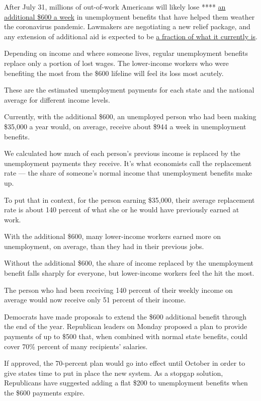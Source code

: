 After July 31, millions of out-of-work Americans will likely lose ****
\href{https://www.nytimes3xbfgragh.onion/2020/07/23/business/economy/unemployment-benefits.html}{an
additional \$600 a week} in unemployment benefits that have helped them
weather the coronavirus pandemic. Lawmakers are negotiating a new relief
package, and any extension of additional aid is expected to be
\href{https://www.nytimes3xbfgragh.onion/2020/07/27/world/coronavirus-covid-19.html}{a
fraction of what it currently is}.

Depending on income and where someone lives, regular unemployment
benefits replace only a portion of lost wages. The lower-income workers
who were benefiting the most from the \$600 lifeline will feel its loss
most acutely.

These are the estimated unemployment payments for each state and the
national average for different income levels.

Currently, with the additional \$600, an unemployed person who had been
making \$35,000 a year would, on average, receive about \$944 a week in
unemployment benefits.

We calculated how much of each person's previous income is replaced by
the unemployment payments they receive. It's what economists call the
replacement rate --- the share of someone's normal income that
unemployment benefits make up.

To put that in context, for the person earning \$35,000, their average
replacement rate is about 140 percent of what she or he would have
previously earned at work.

With the additional \$600, many lower-income workers earned more on
unemployment, on average, than they had in their previous jobs.

Without the additional \$600, the share of income replaced by the
unemployment benefit falls sharply for everyone, but lower-income
workers feel the hit the most.

The person who had been receiving 140 percent of their weekly income on
average would now receive only 51 percent of their income.

Democrats have made proposals to extend the \$600 additional benefit
through the end of the year. Republican leaders on Monday proposed a
plan to provide payments of up to \$500 that, when combined with normal
state benefits, could cover 70\% percent of many recipients' salaries.

If approved, the 70-percent plan would go into effect until October in
order to give states time to put in place the new system. As a stopgap
solution, Republicans have suggested adding a flat \$200 to unemployment
benefits when the \$600 payments expire.


